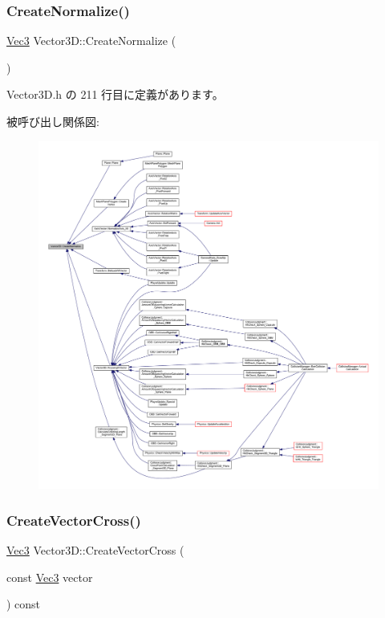 \subsubsection{\texorpdfstring{Create\+Normalize()}{CreateNormalize()}}
{\footnotesize\ttfamily \mbox{\hyperlink{_vector3_d_8h_ab16f59e4393f29a01ec8b9bbbabbe65d}{Vec3}} Vector3\+D\+::\+Create\+Normalize (\begin{DoxyParamCaption}{ }\end{DoxyParamCaption})\hspace{0.3cm}{\ttfamily [inline]}}



 Vector3\+D.\+h の 211 行目に定義があります。

被呼び出し関係図\+:
\nopagebreak
\begin{figure}[H]
\begin{center}
\leavevmode
\includegraphics[width=350pt]{class_vector3_d_ae55e42c07bdfcc6c11bcbc6bf5e27808_icgraph}
\end{center}
\end{figure}
\mbox{\label{class_vector3_d_accbd42535a385947ac5380084f2c688c}} 
\subsubsection{\texorpdfstring{Create\+Vector\+Cross()}{CreateVectorCross()}}
{\footnotesize\ttfamily \mbox{\hyperlink{_vector3_d_8h_ab16f59e4393f29a01ec8b9bbbabbe65d}{Vec3}} Vector3\+D\+::\+Create\+Vector\+Cross (\begin{DoxyParamCaption}\item[{const \mbox{\hyperlink{_vector3_d_8h_ab16f59e4393f29a01ec8b9bbbabbe65d}{Vec3}}}]{vector }\end{DoxyParamCaption}) const\hspace{0.3cm}{\ttfamily [inline]}}



